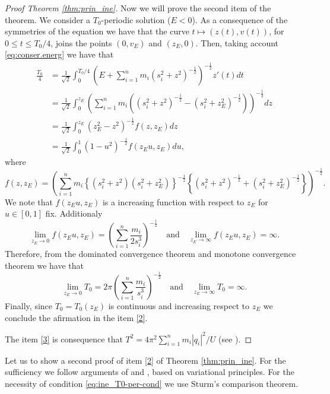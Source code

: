 \documentclass[twoside]{article}
\theoremstyle{remark}
\begin{document}
\begin{proof}[Proof Theorem \ref{thm:prin_ine}]
Now we will prove the second item of the theorem. We consider a $T_0$-periodic solution ($E<0$).  As a consequence of the symmetries of the equation we have that the curve $t\mapsto (z(t),v(t))$, for $0\leq t\leq T_0/4$, joins the points $(0,v_{E})$ and $(z_E,0)$. Then, taking account \eqref{eq:conser.energ} we have that
\begin{equation}
 \begin{split}
  \frac{T_0}{4}&=\frac{1}{\sqrt{2}}\int_0^{T_0/4}\left(E+\sum_{i=1}^n m_i (s_i^2+z^2)^{-\frac12}\right)^{-\frac12} z'(t) dt\\
  &=\frac{1}{\sqrt{2}}\int_0^{z_E}\left(\sum_{i=1}^n m_i \left((s_i^2+z^2)^{-\frac12}-(s_i^2+z_E^2)^{-\frac12}\right)\right)^{-\frac12}dz\\
  &=\frac{1}{\sqrt{2}}\int_0^{z_E} \left(z_E^2-z^2\right)^{-\frac12} f(z,z_E)dz\\
  &=\frac{1}{\sqrt{2}}\int_0^1 \left(1-u^2\right)^{-\frac12} f(z_Eu,z_E)du,
 \end{split}
\end{equation}
where \[f(z,z_E)=\left(\sum_{i=1}^n m_i \left\{(s_i^2+z^2)(s_i^2+z_E^2)\right\}^{-\frac12} \left\{(s_i^2+z^2)^{-\frac12}+(s_i^2+z_E^2)^{-\frac12} \right\}\right)^{-\frac12}.\]
We note that $f(z_Eu,z_E)$ is a increasing function with respect to $z_E$ for $u\in [0,1]$ fix. Additionaly
\begin{equation*}
 \lim\limits_{z_E \to 0}f(z_Eu,z_E)=\left(\sum_{i=1}^{n} \frac{m_i}{2s_i^3}\right)^{-\frac12} \quad \text{and}\quad  \lim\limits_{z_E \to \infty}f(z_Eu,z_E)=\infty.
\end{equation*}
Therefore, from the dominated convergence theorem and monotone convergence theorem we have that
\[\lim\limits_{z_E\to 0}T_0=2\pi\left(\sum_{i=1}^{n} \frac{m_i}{s_i^3}\right)^{-\frac12}\quad \text{and}\quad \lim\limits_{z_E\to \infty}T_0=\infty.\]
Finally,  since $T_0=T_0(z_E)$ is continuous and increasing respect to $z_E$ we conclude the afirmation in the item \ref{2}.



The item \ref{3} is consequence that $T^2=4\pi^2 \sum_{i=1}^{n}m_i|q_i|^2/U$   (see \cite[p. 109]{JaumeLlibre276}).
\end{proof}






Let us to show a second proof of item \ref{2} of Theorem \ref{thm:prin_ine}. For the sufficiency we  follow arguments of \cite{zhao2015nonplanar} and \cite{li2013characterization}, based on variational principles. For the necessity of condition \eqref{eq:ine_T0-per-cond} we use Sturm's comparison theorem.
\end{document}
